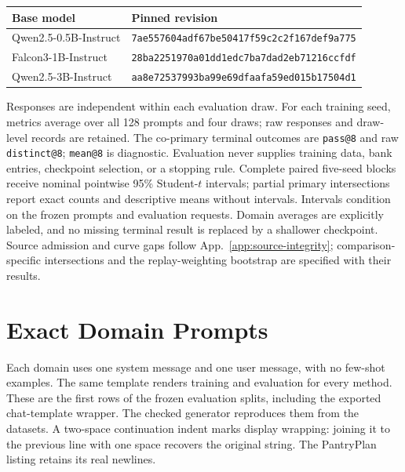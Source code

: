 \documentclass{article}
\newcommand{\1}{\mathbf 1}
\theoremstyle{remark}
\theoremstyle{definition}
\theoremstyle{plain}
\begin{document}
\begin{center}
\small
\begin{tabular}{@{}ll@{}}
\toprule
\textbf{Base model} & \textbf{Pinned revision} \\
\midrule
Qwen2.5-0.5B-Instruct & {\scriptsize\texttt{7ae557604adf67be50417f59c2c2f167def9a775}} \\
Falcon3-1B-Instruct & {\scriptsize\texttt{28ba2251970a01dd1edc7ba7dad2eb71216ccfdf}} \\
Qwen2.5-3B-Instruct & {\scriptsize\texttt{aa8e72537993ba99e69dfaafa59ed015b17504d1}} \\
\bottomrule
\end{tabular}
\end{center}

Responses are independent within each evaluation draw. For each training
seed, metrics average over all 128 prompts and four draws; raw responses
and draw-level records are retained. The co-primary terminal outcomes are
\texttt{pass@8} and raw \texttt{distinct@8}; \texttt{mean@8} is diagnostic.
Evaluation never supplies training data, bank entries, checkpoint selection,
or a stopping rule. Complete paired five-seed blocks receive nominal
pointwise 95\% Student-$t$ intervals; partial primary intersections report
exact counts and descriptive means without intervals. Intervals condition
on the frozen prompts and evaluation requests. Domain averages are
explicitly labeled, and no missing terminal result is replaced by a
shallower checkpoint. Source admission and curve gaps follow
App.~\ref{app:source-integrity}; comparison-specific intersections and
the replay-weighting bootstrap are specified with their results.

\section{Exact Domain Prompts}
\label{app:prompts}

Each domain uses one system message and one user message, with no few-shot
examples. The same template renders training and evaluation for every
method. These are the first rows of the frozen evaluation splits, including
the exported chat-template wrapper. The checked generator
 reproduces them from the datasets.
A two-space continuation indent marks display wrapping: joining it to the
previous line with one space recovers the original string. The PantryPlan
listing retains its real newlines.

\end{document}
